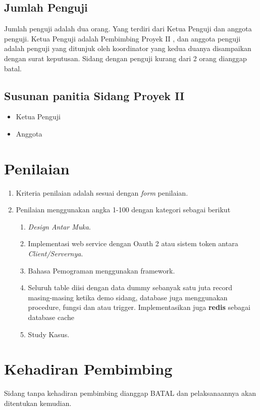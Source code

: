 	\subsection{Jumlah Penguji}
	Jumlah	penguji	adalah dua	orang. Yang	terdiri	dari	Ketua	Penguji	dan	anggota	penguji.
Ketua	Penguji		adalah	Pembimbing	Proyek II ,	dan	anggota	penguji	adalah	penguji	yang	
ditunjuk	 oleh	 koordinator	 yang	 kedua	 duanya	 disampaikan	 dengan	 surat	 keputusan.	
Sidang dengan	penguji	kurang	dari	2	orang	dianggap	batal.
	\subsection{Susunan	panitia	Sidang Proyek II}
	\begin{itemize}
		\item Ketua Penguji
		\item Anggota
	\end{itemize}
	
\section{Penilaian}
\begin{enumerate}
	\item Kriteria	penilaian	adalah	sesuai	dengan \textit{form} penilaian.
	\item Penilaian	menggunakan	angka	1-100 dengan	kategori	sebagai	berikut
		\begin{enumerate}[label=(\alph*)]
		\item \textit{Design	Antar	Muka}.
		\item Implementasi web	 service	 dengan	 Oauth	 2	 atau	 				  sistem	 token	 antara	\textit{Client/Servernya}.
		\item Bahasa	Pemograman	menggunakan	framework.
		\item Seluruh	 table	 diisi	 dengan	 data	 dummy	 sebanyak	 satu	 juta	 record	 masing-masing	 ketika	demo	 sidang, database	juga	menggunakan	procedure,	 fungsi	dan atau trigger. Implementasikan	juga \textbf{redis} sebagai	database	cache
		\item Study Kasus.
		\end{enumerate}
\end{enumerate}

\section{Kehadiran Pembimbing}
	Sidang tanpa	kehadiran	pembimbing	dianggap	BATAL	dan	pelaksanaannya	akan	ditentukan	
kemudian.

